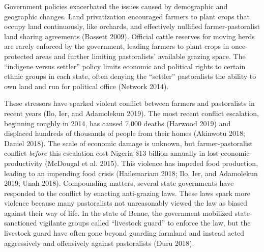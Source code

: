 \documentclass[11pt]{article}
\begin{document}
Government policies exacerbated the issues caused by demographic and
geographic changes. Land privatization encouraged farmers to plant crops
that occupy land continuously, like orchards, and effectively nullified
farmer-pastoralist land sharing agreements (Bassett 2009). Official
cattle reserves for moving herds are rarely enforced by the government,
leading farmers to plant crops in once-protected areas and further
limiting pastoralists' available grazing space. The ``indigene versus
settler'' policy limits economic and political rights to certain ethnic
groups in each state, often denying the ``settler'' pastoralists the
ability to own land and run for political office (Network 2014).

These stressors have sparked violent conflict between farmers and
pastoralists in recent years (Ilo, Ier, and Adamolekun 2019). The most
recent conflict escalation, beginning roughly in 2014, has caused 7,000
deaths (Harwood 2019) and displaced hundreds of thousands of people from
their homes (Akinwotu 2018; Daniel 2018). The scale of economic damage
is unknown, but farmer-pastoralist conflict \emph{before} this
escalation cost Nigeria \$13 billion annually in lost economic
productivity (McDougal et al. 2015). This violence has impeded food
production, leading to an impending food crisis (Hailemariam 2018; Ilo,
Ier, and Adamolekun 2019; Unah 2018). Compounding matters, several state
governments have responded to the conflict by enacting anti-grazing
laws. These laws spark more violence because many pastoralists not
unreasonably viewed the law as biased against their way of life. In the
state of Benue, the government mobilized state-sanctioned vigilante
groups called ``livestock guard'' to enforce the law, but the livestock
guard have often gone beyond guarding farmland and instead acted
aggressively and offensively against pastoralists (Duru 2018).
\end{document}
